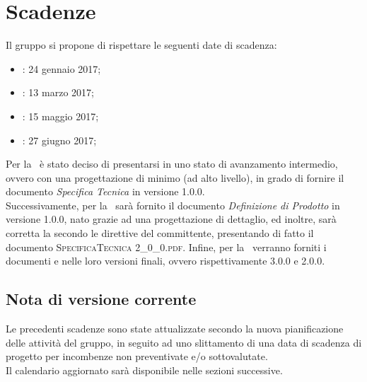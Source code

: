 \newpage
\section{Scadenze}
Il gruppo \textit{\gruppo} si propone di rispettare le seguenti date di scadenza:
\begin{itemize}
	\item \textbf{\RR}: 24 gennaio 2017;
	\item \textbf{\RP}: 13 marzo 2017;
	\item \textbf{\RQ}: 15 maggio 2017;
	\item \textbf{\RA}: 27 giugno 2017;
\end{itemize}
Per la \RP\ è stato deciso di presentarsi in uno stato di avanzamento intermedio, ovvero con una progettazione di minimo (ad alto livello), in grado di fornire il documento \textit{Specifica Tecnica} in versione 1.0.0.\\
Successivamente, per la \RQ\ sarà fornito il documento \textit{Definizione di Prodotto} in versione 1.0.0, nato grazie ad una progettazione di dettaglio, ed inoltre, sarà corretta la \textit{\ST} secondo le direttive del committente, presentando di fatto il documento \textsc{SpecificaTecnica 2\_0\_0.pdf}.
Infine, per la \RA\ verranno forniti i documenti \textit{\ST} e \textit{\DDP} nelle loro versioni finali, ovvero rispettivamente 3.0.0 e 2.0.0.

\subsection{Nota di versione corrente}
Le precedenti scadenze sono state attualizzate secondo la nuova pianificazione delle attività del gruppo, in seguito ad uno slittamento di una data di scadenza di progetto per incombenze non preventivate e/o sottovalutate.\\
Il calendario aggiornato sarà disponibile nelle sezioni successive.